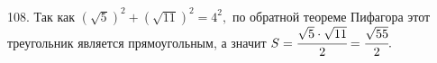 108. Так как $(\sqrt{5})^2+(\sqrt{11})^2=4^2,$ по обратной теореме Пифагора этот треугольник является прямоугольным, а значит $S=\cfrac{\sqrt{5}\cdot\sqrt{11}}{2}=\cfrac{\sqrt{55}}{2}.$\newpage\noindent

